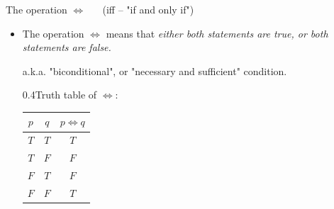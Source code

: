 \documentclass[12pt,aspectratio=1610, handout]{beamer}
\begin{document}
\begin{frame}{The operation $\iff$  ~~ (iff -- "if and only if")}
	\begin{itemize}
		\item The operation $\iff$ means that \emph{either both statements are true, or both statements are false.} 
		
		a.k.a. "biconditional", or "necessary and sufficient" condition.
		
		\p
		\begin{center}
		\begin{blockz}{0.4}{Truth table of $\iff$:}
			\begin{tabular}{|c|c|c|}
				\hline
				$p$ & $q$ & $p \iff q$ \\
				\hline
				$T$ & $T$ & $T$ \\
				\hline
				$T$ & $F$ & $F$ \\
				\hline
				$F$ & $T$ & $F$ \\ 
				\hline
				$F$ & $F$ & $T$ \\
				\hline
			\end{tabular}
		\end{blockz}
		\end{center}
	\end{itemize}
\end{frame}
\end{document}
